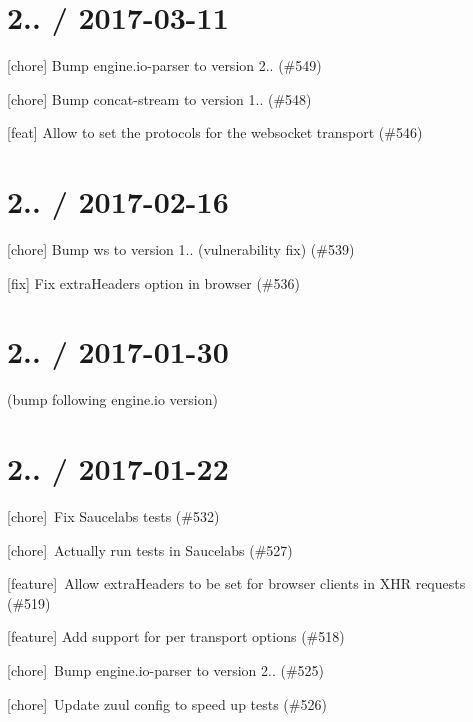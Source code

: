 \section*{2.. / 2017-\/03-\/11 }


\begin{DoxyItemize}
\item \mbox{[}chore\mbox{]} Bump engine.\+io-\/parser to version 2.. (\#549)
\item \mbox{[}chore\mbox{]} Bump concat-\/stream to version 1.. (\#548)
\item \mbox{[}feat\mbox{]} Allow to set the protocols for the websocket transport (\#546)
\end{DoxyItemize}

\section*{2.. / 2017-\/02-\/16 }


\begin{DoxyItemize}
\item \mbox{[}chore\mbox{]} Bump ws to version 1.. (vulnerability fix) (\#539)
\item \mbox{[}fix\mbox{]} Fix extra\+Headers option in browser (\#536)
\end{DoxyItemize}

\section*{2.. / 2017-\/01-\/30 }

(bump following engine.\+io version)

\section*{2.. / 2017-\/01-\/22 }


\begin{DoxyItemize}
\item \mbox{[}chore\mbox{]} \+Fix Saucelabs tests (\#532)
\item \mbox{[}chore\mbox{]} \+Actually run tests in Saucelabs (\#527)
\item \mbox{[}feature\mbox{]} \+Allow extra\+Headers to be set for browser clients in X\+HR requests (\#519)
\item \mbox{[}feature\mbox{]} Add support for per transport options (\#518)
\item \mbox{[}chore\mbox{]} \+Bump engine.\+io-\/parser to version 2.. (\#525)
\item \mbox{[}chore\mbox{]} \+Update zuul config to speed up tests (\#526)
\end{DoxyItemize}


